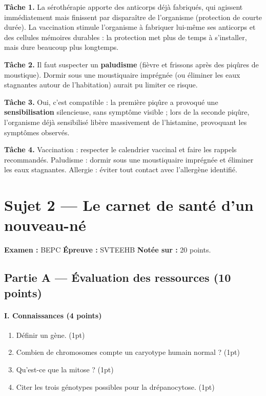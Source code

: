 \textbf{Tâche 1.} La sérothérapie apporte des anticorps déjà fabriqués, qui agissent
immédiatement mais finissent par disparaître de l'organisme (protection de courte
durée). La vaccination stimule l'organisme à fabriquer lui-même ses anticorps et des
cellules mémoires durables : la protection met plus de temps à s'installer, mais dure
beaucoup plus longtemps.

\textbf{Tâche 2.} Il faut suspecter un \textbf{paludisme} (fièvre et frissons après
des piqûres de moustique). Dormir sous une moustiquaire imprégnée (ou éliminer les
eaux stagnantes autour de l'habitation) aurait pu limiter ce risque.

\textbf{Tâche 3.} Oui, c'est compatible : la première piqûre a provoqué une
\textbf{sensibilisation} silencieuse, sans symptôme visible ; lors de la seconde
piqûre, l'organisme déjà sensibilisé libère massivement de l'histamine, provoquant
les symptômes observés.

\textbf{Tâche 4.} Vaccination : respecter le calendrier vaccinal et faire les
rappels recommandés. Paludisme : dormir sous une moustiquaire imprégnée et éliminer
les eaux stagnantes. Allergie : éviter tout contact avec l'allergène identifié.

\section{Sujet 2 — Le carnet de santé d'un nouveau-né}

\noindent\textbf{Examen :} BEPC \quad\textbf{Épreuve :} SVTEEHB \quad\textbf{Notée
sur :} 20 points.

\subsection*{Partie A — Évaluation des ressources (10 points)}

\paragraph{I. Connaissances (4 points)}
\begin{enumerate}[label=\arabic*)]
\item Définir un gène. \hfill (1pt)
\item Combien de chromosomes compte un caryotype humain normal ? \hfill (1pt)
\item Qu'est-ce que la mitose ? \hfill (1pt)
\item Citer les trois génotypes possibles pour la drépanocytose. \hfill (1pt)
\end{enumerate}

